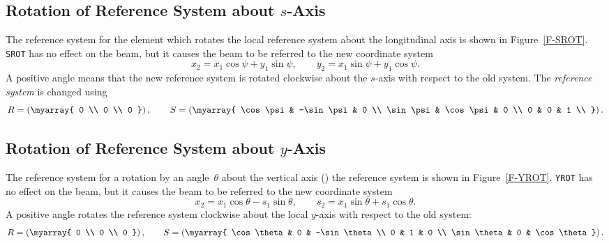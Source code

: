 \subsection{Rotation of Reference System about $s$-Axis}
The reference system for the  element which  rotates the
local reference system about the longitudinal axis is shown in
Figure~\ref{F-SROT}.
{\tt SROT} has no effect on the beam,
but it causes the beam to be referred to the new coordinate system
\begin{equation}
x_2=x_1 \cos\psi + y_1 \sin\psi,
\qquad
y_2=x_1 \sin\psi + y_1 \cos\psi.
\end{equation}
A positive angle means that the new reference system is rotated clockwise
about the $s$-axis with respect to the old system.
The {\em reference system} is changed using
\begin{equation}
R = \left( \myarray{ 0 \\ 0 \\ 0 } \right), \qquad
S = \left( \myarray{
    \cos\psi & -\sin\psi &  0 \\
    \sin\psi &  \cos\psi &  0 \\
    0        &  0        &  1 \\
} \right).       
\end{equation}
 
\subsection{Rotation of Reference System about $y$-Axis}
The reference system for a rotation by an angle~$\theta$
about the vertical axis ()
the reference system is shown in Figure~\ref{F-YROT}.
{\tt YROT} has no effect on the beam,
but it causes the beam to be referred to the new coordinate system
\begin{equation}
x_2=x_1 \cos\theta - s_1 \sin\theta,
\qquad
s_2=x_1 \sin\theta + s_1 \cos\theta.
\end{equation}
A positive angle rotates the reference system clockwise about the
local $y$-axis with respect to the old system:
\begin{equation}
R = \left( \myarray{ 0 \\ 0 \\ 0 } \right), \qquad
S = \left(\myarray{
    \cos\theta &  0 & -\sin\theta \\
    0          &  1 &  0 \\
    \sin\theta &  0 &  \cos\theta
} \right).
\end{equation}
 
